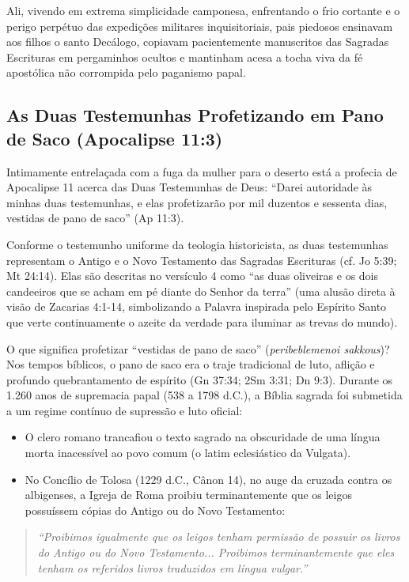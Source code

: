 Ali, vivendo em extrema simplicidade camponesa, enfrentando o frio cortante e o perigo perpétuo das expedições militares inquisitoriais, pais piedosos ensinavam aos filhos o santo Decálogo, copiavam pacientemente manuscritos das Sagradas Escrituras em pergaminhos ocultos e mantinham acesa a tocha viva da fé apostólica não corrompida pelo paganismo papal.



\subsection{As Duas Testemunhas Profetizando em Pano de Saco (Apocalipse 11:3)}


Intimamente entrelaçada com a fuga da mulher para o deserto está a profecia de Apocalipse 11 acerca das Duas Testemunhas de Deus: ``Darei autoridade às minhas duas testemunhas, e elas profetizarão por mil duzentos e sessenta dias, vestidas de pano de saco'' (Ap 11:3).

Conforme o testemunho uniforme da teologia historicista, as duas testemunhas representam o Antigo e o Novo Testamento das Sagradas Escrituras (cf. Jo 5:39; Mt 24:14). Elas são descritas no versículo 4 como ``as duas oliveiras e os dois candeeiros que se acham em pé diante do Senhor da terra'' (uma alusão direta à visão de Zacarias 4:1-14, simbolizando a Palavra inspirada pelo Espírito Santo que verte continuamente o azeite da verdade para iluminar as trevas do mundo).

O que significa profetizar ``vestidas de pano de saco'' (\textit{peribeblemenoi sakkous})? Nos tempos bíblicos, o pano de saco era o traje tradicional de luto, aflição e profundo quebrantamento de espírito (Gn 37:34; 2Sm 3:31; Dn 9:3). Durante os 1.260 anos de supremacia papal (538 a 1798 d.C.), a Bíblia sagrada foi submetida a um regime contínuo de supressão e luto oficial:
\begin{itemize}
  \item O clero romano trancafiou o texto sagrado na obscuridade de uma língua morta inacessível ao povo comum (o latim eclesiástico da Vulgata).
  \item No Concílio de Tolosa (1229 d.C., Cânon 14), no auge da cruzada contra os albigenses, a Igreja de Roma proibiu terminantemente que os leigos possuíssem cópias do Antigo ou do Novo Testamento:
\end{itemize}


\begin{quote}
\itshape \textit{``Proibimos igualmente que os leigos tenham permissão de possuir os livros do Antigo ou do Novo Testamento... Proibimos terminantemente que eles tenham os referidos livros traduzidos em língua vulgar.''}
\end{quote}

